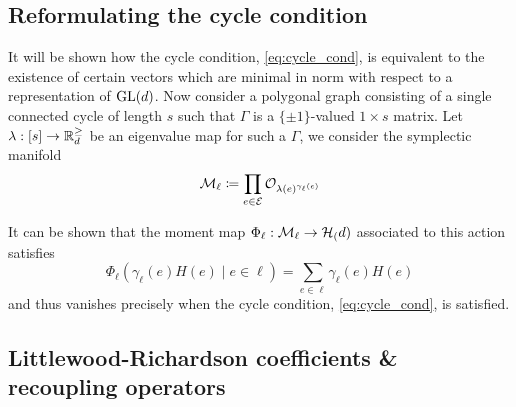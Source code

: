 \documentclass[notitlepage, 10pt]{article}
\begin{document}
\subsection{Reformulating the cycle condition}
\label{sec:reform_cycle}

It will be shown how the cycle condition, \cref{eq:cycle_cond}, is equivalent to the existence of certain vectors which are minimal in norm with respect to a representation of $\operatorname{GL}(d)$.
Now consider a polygonal graph consisting of a single connected cycle of length $s$ such that $\Gamma$ is a $\{\pm 1\}$-valued $1\times s$ matrix.
Let $\lambda : [s] \to \mathbb R^{\geq}_{d}$ be an eigenvalue map for such a $\Gamma$, we consider the symplectic manifold
\begin{equation}
    \mathcal M_{\ell} \coloneqq \prod_{e \in \mathcal E} \mathcal O_{\lambda(e)^{\gamma_{\ell}(e)}}
\end{equation}

It can be shown that the moment map $\Phi_{\ell} : \mathcal M_{\ell} \to \mathcal H_{(}d)$ associated to this action satisfies
\begin{equation}
    \Phi_{\ell}(\gamma_{\ell}(e)H(e) \mid e \in \ell) = \sum_{e \in \ell} \gamma_{\ell}(e)H(e)
\end{equation}
and thus vanishes precisely when the cycle condition, \cref{eq:cycle_cond}, is satisfied.

\subsection{Littlewood-Richardson coefficients \& recoupling operators}
\end{document}
